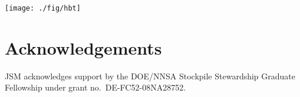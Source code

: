 \documentclass[aps,prc,reprint,amsmath,nofootinbib,superscriptaddress]{revtex4-1}
\begin{document}
\begin{figure*}[t]
  \texttt{[image: ./fig/hbt]}
  \caption{
    \label{fig:spectra}
  }
\end{figure*}


\section{Acknowledgements}

\medskip
JSM acknowledges support by the DOE/NNSA Stockpile Stewardship Graduate Fellowship under grant no.~DE-FC52-08NA28752.


\end{document}
